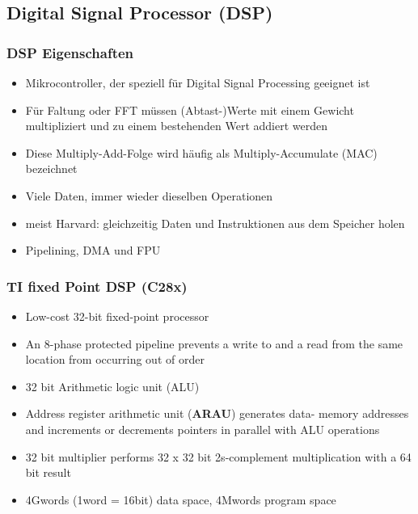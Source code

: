 \subsection{Digital Signal Processor (DSP)}
\begin{multicols}{2}
\subsubsection{DSP Eigenschaften}
\begin{itemize}
    \item Mikrocontroller, der speziell für Digital Signal Processing geeignet ist
    \item Für Faltung oder FFT müssen (Abtast-)Werte mit einem Gewicht multipliziert und zu einem bestehenden Wert addiert werden
    \item Diese Multiply-Add-Folge wird häufig als Multiply-Accumulate (MAC) bezeichnet
    \item Viele Daten, immer wieder dieselben Operationen
    \item meist Harvard: gleichzeitig Daten und Instruktionen aus dem Speicher holen
    \item Pipelining, DMA und FPU
\end{itemize}
\columnbreak
\subsubsection{TI fixed Point DSP (C28x)}
\begin{itemize}
    \item Low-cost 32-bit fixed-point processor
    \item An 8-phase protected pipeline prevents a write to and a read from the same
location from occurring out of order
    \item 32 bit Arithmetic logic unit (ALU)
    \item Address register arithmetic unit (\textbf{ARAU}) generates data- memory addresses
and increments or decrements pointers in parallel with ALU operations
    \item 32 bit multiplier performs 32 x 32 bit 2s-complement multiplication with a 64
bit result
    \item 4Gwords (1word = 16bit) data space, 4Mwords program space
\end{itemize}
\end{multicols}

